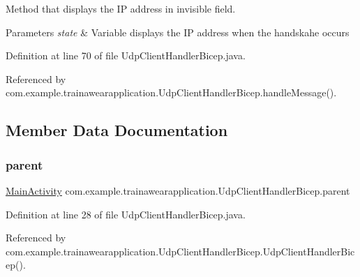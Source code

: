 Method that displays the IP address in invisible field. 


\begin{DoxyParams}{Parameters}
{\em state} & Variable displays the IP address when the handskahe occurs \\
\hline
\end{DoxyParams}


Definition at line 70 of file Udp\+Client\+Handler\+Bicep.\+java.


\begin{DoxyCode}{0}

\end{DoxyCode}


Referenced by com.\+example.\+trainawearapplication.\+Udp\+Client\+Handler\+Bicep.\+handle\+Message().



\subsection{Member Data Documentation}
\mbox{\label{classcom_1_1example_1_1trainawearapplication_1_1_udp_client_handler_bicep_a0b203f16a962458064aebb68efbd72bb}} 
\subsubsection{\texorpdfstring{parent}{parent}}
{\footnotesize\ttfamily \mbox{\hyperlink{classcom_1_1example_1_1trainawearapplication_1_1_main_activity}{Main\+Activity}} com.\+example.\+trainawearapplication.\+Udp\+Client\+Handler\+Bicep.\+parent\hspace{0.3cm}{\ttfamily [private]}}



Definition at line 28 of file Udp\+Client\+Handler\+Bicep.\+java.



Referenced by com.\+example.\+trainawearapplication.\+Udp\+Client\+Handler\+Bicep.\+Udp\+Client\+Handler\+Bicep().

